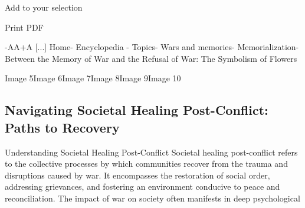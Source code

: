 \documentclass[12pt]{article}
\begin{document}
Add to your selection

   Print
   PDF

-AA+A [...] Home- Encyclopedia - Topics- Wars and memories- Memorialization-  Between the Memory of War and the Refusal of War: The Symbolism of Flowers 

Image 5Image 6Image 7Image 8Image 9Image 10\subsection{Navigating Societal Healing Post-Conflict: Paths to Recovery}
Understanding Societal Healing Post-Conflict Societal healing post-conflict refers to the collective processes by which communities recover from the trauma and disruptions caused by war. It encompasses the restoration of social order, addressing grievances, and fostering an environment conducive to peace and reconciliation. The impact of war on society often manifests in deep psychological
\end{document}
